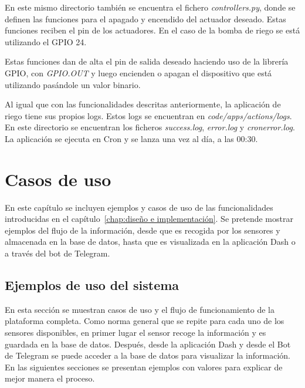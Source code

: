 \documentclass[a4paper, 12pt, oneside]{book}
\begin{document}
En este mismo directorio también se encuentra el fichero \textit{controllers.py}, donde se definen las funciones para el apagado y encendido del actuador deseado. Estas funciones reciben el pin de los actuadores. En el caso de la bomba de riego se está utilizando el GPIO 24.

Estas funciones dan de alta el pin de salida deseado haciendo uso de la librería GPIO, con \textit{GPIO.OUT} y luego encienden o apagan el dispositivo que está utilizando pasándole un valor binario.

Al igual que con las funcionalidades descritas anteriormente, la aplicación de riego tiene sus propios logs. Estos logs se encuentran en \textit{code/apps/actions/logs}. En este directorio se encuentran los ficheros \textit{success.log}, \textit{error.log} y \textit{cronerror.log}.
La aplicación se ejecuta en Cron y se lanza una vez al día, a las 00:30.


\cleardoublepage
\chapter{Casos de uso}
\label{chap:casos de uso}

En este capítulo se incluyen ejemplos y casos de uso de las funcionalidades introducidas en el capítulo~\ref{chap:diseño e implementación}. Se pretende mostrar ejemplos del flujo de la información, desde que es recogida por los sensores y almacenada en la base de datos, hasta que es visualizada en la aplicación Dash o a través del bot de Telegram.

\section{Ejemplos de uso del sistema}
\label{sec:aplicación de dash ejemplos}
En esta sección se muestran casos de uso y el flujo de funcionamiento de la plataforma completa.
Como norma general que se repite para cada uno de los sensores disponibles, en primer lugar el sensor recoge la información y es guardada en la base de datos. Después, desde la aplicación Dash y desde el Bot de Telegram se puede acceder a la base de datos para visualizar la información. En las siguientes secciones se presentan ejemplos con valores para explicar de mejor manera el proceso.
\end{document}
